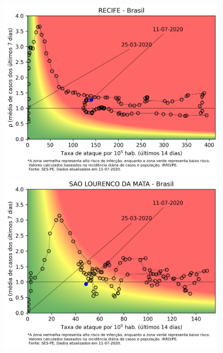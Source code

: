 \documentclass[]{article}
\begin{document}

\begin{figure}[!h]
	\centering
	\begin{minipage}[t]{4cm}
		\centering
		\includegraphics[scale=0.5]{../RECIFE.png}
	\end{minipage}
	\hspace{5cm}
	\begin{minipage}[t]{4cm}
		\centering
		\includegraphics[scale=0.5]{../SAO LOURENCO DA MATA.png}
			\vspace{0.2cm}
	\end{minipage}


\end{figure}
\end{document}
